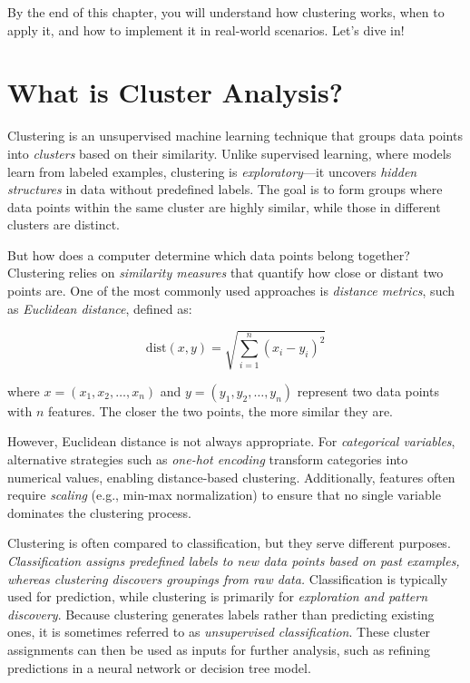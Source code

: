 \documentclass[
]{book}
\theoremstyle{definition}
\theoremstyle{definition}
\theoremstyle{definition}
\theoremstyle{definition}
\theoremstyle{remark}
\begin{document}
By the end of this chapter, you will understand how clustering works, when to apply it, and how to implement it in real-world scenarios. Let's dive in!

\section{What is Cluster Analysis?}\label{cluster-what}

Clustering is an unsupervised machine learning technique that groups data points into \emph{clusters} based on their similarity. Unlike supervised learning, where models learn from labeled examples, clustering is \emph{exploratory}---it uncovers \emph{hidden structures} in data without predefined labels. The goal is to form groups where data points within the same cluster are highly similar, while those in different clusters are distinct.

But how does a computer determine which data points belong together? Clustering relies on \emph{similarity measures} that quantify how close or distant two points are. One of the most commonly used approaches is \emph{distance metrics}, such as \emph{Euclidean distance}, defined as:

\[
\text{dist}(x, y) = \sqrt{ \sum_{i=1}^n (x_i - y_i)^2}
\]

where \(x = (x_1, x_2, \ldots, x_n)\) and \(y = (y_1, y_2, \ldots, y_n)\) represent two data points with \(n\) features. The closer the two points, the more similar they are.

However, Euclidean distance is not always appropriate. For \emph{categorical variables}, alternative strategies such as \emph{one-hot encoding} transform categories into numerical values, enabling distance-based clustering. Additionally, features often require \emph{scaling} (e.g., min-max normalization) to ensure that no single variable dominates the clustering process.

Clustering is often compared to classification, but they serve different purposes. \emph{Classification assigns predefined labels to new data points based on past examples, whereas clustering discovers groupings from raw data.} Classification is typically used for prediction, while clustering is primarily for \emph{exploration and pattern discovery}. Because clustering generates labels rather than predicting existing ones, it is sometimes referred to as \emph{unsupervised classification}. These cluster assignments can then be used as inputs for further analysis, such as refining predictions in a neural network or decision tree model.
\end{document}
